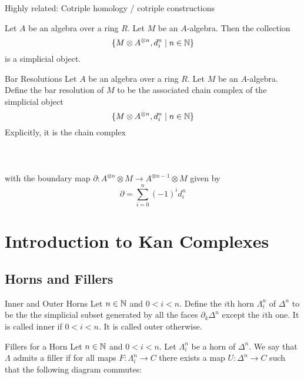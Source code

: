 \documentclass[a4paper]{article}
\begin{document}
Highly related: Cotriple homology / cotriple constructions

\begin{prp}{}{} Let $A$ be an algebra over a ring $R$. Let $M$ be an $A$-algebra. Then the collection $$\{M\otimes A^{\otimes n},d_i^n\;|\;n\in\mathbb{N}\}$$ is a simplicial object. 
\end{prp}

\begin{defn}{Bar Resolutions}{} Let $A$ be an algebra over a ring $R$. Let $M$ be an $A$-algebra. Define the bar resolution of $M$ to be the associated chain complex of the simplicial object $$\{M\otimes A^{\otimes n},d_i^n\;|\;n\in\mathbb{N}\}$$ Explicitly, it is the chain complex \\~\\
\\~\\
with the boundary map $\partial:A^{\otimes n}\otimes M\to A^{\otimes n-1}\otimes M$ given by $$\partial=\sum_{i=0}^n(-1)^id_i^n$$
\end{defn}

\pagebreak
\section{Introduction to Kan Complexes}
\subsection{Horns and Fillers}
\begin{defn}{Inner and Outer Horns}{} Let $n\in\mathbb{N}$ and $0<i<n$. Define the $i$th horn $\Lambda_i^n$ of $\Delta^n$ to be the the simplicial subset generated by all the faces $\partial_k\Delta^n$ except the $i$th one. It is called inner if $0<i<n$. It is called outer otherwise. 
\end{defn}

\begin{defn}{Fillers for a Horn}{} Let $n\in\mathbb{N}$ and $0<i<n$. Let $\Lambda_i^n$ be a horn of $\Delta^n$. We say that $\Lambda$ admits a filler if for all maps $F:\Lambda_i^n\to C$ there exists a map $U:\Delta^n\to C$ such that the following diagram commutes: \\~\\
\end{defn}
\end{document}
